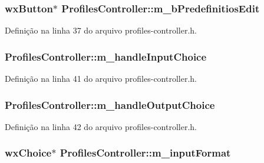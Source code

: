 \subsubsection[{m\+\_\+b\+Predefinitios\+Edit}]{\setlength{\rightskip}{0pt plus 5cm}wx\+Button$\ast$ Profiles\+Controller\+::m\+\_\+b\+Predefinitios\+Edit\hspace{0.3cm}{\ttfamily [protected]}}\label{class_profiles_controller_a43b0f1a2c39fc1847adc346be03d3f51}


Definição na linha 37 do arquivo profiles-\/controller.\+h.

\subsubsection[{m\+\_\+handle\+Input\+Choice}]{ Profiles\+Controller\+::m\+\_\+handle\+Input\+Choice\hspace{0.3cm}{\ttfamily [protected]}}\label{class_profiles_controller_acfbb5f1a885f9fb8e480e744e636df06}


Definição na linha 41 do arquivo profiles-\/controller.\+h.

\subsubsection[{m\+\_\+handle\+Output\+Choice}]{ Profiles\+Controller\+::m\+\_\+handle\+Output\+Choice\hspace{0.3cm}{\ttfamily [protected]}}\label{class_profiles_controller_a5b77ba50c2a348817a7e4ff72ff2071d}


Definição na linha 42 do arquivo profiles-\/controller.\+h.

\subsubsection[{m\+\_\+input\+Format}]{\setlength{\rightskip}{0pt plus 5cm}wx\+Choice$\ast$ Profiles\+Controller\+::m\+\_\+input\+Format\hspace{0.3cm}{\ttfamily [protected]}}\label{class_profiles_controller_aa23a651cbd1fb3ba4911f1bc1daa1960}



